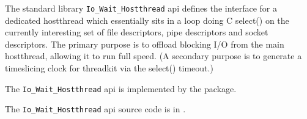 
The standard library {\tt Io\_Wait\_Hostthread} api defines the interface for a dedicated 
hostthread  which 
essentially sits in a loop doing C select() on the currently interesting set of file descriptors, 
pipe descriptors and socket descriptors.  The primary purpose is to offload blocking I/O from 
the main  hostthread, allowing it to run full speed. 
(A secondary purpose is to generate a timeslicing clock for threadkit via the select() timeout.) 

The {\tt Io\_Wait\_Hostthread} api is implemented by the  package.

The {\tt Io\_Wait\_Hostthread} api source code is in .
